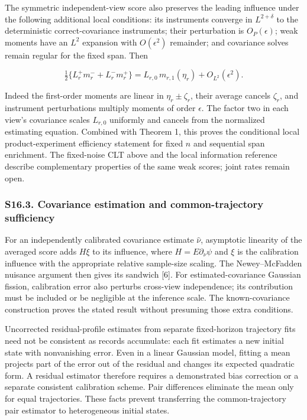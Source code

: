 \documentclass[
  american,
  11pt,
]{article}
\begin{document}
The symmetric independent-view score also preserves the leading
influence under the following additional local conditions: its
instruments converge in \(L^{2+\delta}\) to the deterministic
correct-covariance instruments; their perturbation is \(O_P(\epsilon)\);
weak moments have an \(L^2\) expansion with \(O(\epsilon^2)\) remainder;
and covariance solves remain regular for the fixed span. Then

\[
\tfrac12\{L_r^+m_r^-+L_r^-m_r^+\}
=L_{r,0}\,m_{r,1}(\eta_r)+O_{L^2}(\epsilon^2).
\]

Indeed the first-order moments are linear in \(\eta_r\pm\zeta_r\), their
average cancels \(\zeta_r\), and instrument perturbations multiply
moments of order \(\epsilon\). The factor two in each view's covariance
scales \(L_{r,0}\) uniformly and cancels from the normalized estimating
equation. Combined with Theorem 1, this proves the conditional local
product-experiment efficiency statement for fixed \(n\) and sequential
span enrichment. The fixed-noise CLT above and the local information
reference describe complementary properties of the same weak scores;
joint rates remain open.

\subsubsection{S16.3. Covariance estimation and common-trajectory
sufficiency}\label{s16.3.-covariance-estimation-and-common-trajectory-sufficiency}

For an independently calibrated covariance estimate \(\widehat\nu\),
asymptotic linearity of the averaged score adds \(H\xi\) to its
influence, where \(H=E\partial_\nu\psi\) and \(\xi\) is the calibration
influence with the appropriate relative sample-size scaling. The
Newey--McFadden nuisance argument then gives its sandwich {[}6{]}. For
estimated-covariance Gaussian fission, calibration error also perturbs
cross-view independence; its contribution must be included or be
negligible at the inference scale. The known-covariance construction
proves the stated result without presuming those extra conditions.

Uncorrected residual-profile estimates from separate fixed-horizon
trajectory fits need not be consistent as records accumulate: each fit
estimates a new initial state with nonvanishing error. Even in a linear
Gaussian model, fitting a mean projects part of the error out of the
residual and changes its expected quadratic form. A residual estimator
therefore requires a demonstrated bias correction or a separate
consistent calibration scheme. Pair differences eliminate the mean only
for equal trajectories. These facts prevent transferring the
common-trajectory pair estimator to heterogeneous initial states.
\end{document}
